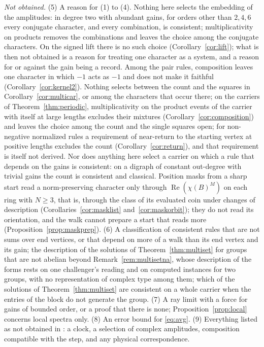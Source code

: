 \emph{Not obtained.} (5) A reason for (1) to (4). Nothing here selects the embedding of the amplitudes: in degree two with abundant gains, for orders other than $2,4,6$ every conjugate character, and every combination, is consistent; multiplicativity on products removes the combinations and leaves the choice among the conjugate characters. On the signed lift there is no such choice (Corollary~\ref{cor:lift}); what is then not obtained is a reason for treating one character as a system, and a reason for or against the gain being a record. Among the pair rules, composition leaves one character in which $-1$ acts as $-1$ and does not make it faithful (Corollary~\ref{cor:kernel2}). Nothing selects between the count and the squares in Corollary~\ref{cor:multicar}, or among the characters that occur there; on the carriers of Theorem~\ref{thm:periodic}, multiplicativity on the product events of the carrier with itself at large lengths excludes their mixtures (Corollary~\ref{cor:composition}) and leaves the choice among the count and the single squares open; for non-negative normalized rules a requirement of near-return to the starting vertex at positive lengths excludes the count (Corollary~\ref{cor:return}), and that requirement is itself not derived. Nor does anything here select a carrier on which a rule that depends on the gains is consistent: on a digraph of constant out-degree with trivial gains the count is consistent and classical. Position masks from a sharp start read a norm-preserving character only through $\operatorname{Re}(\chi(B)^{M})$ on each ring with $N\ge3$, that is, through the class of its evaluated coin under changes of description (Corollaries~\ref{cor:masklist} and~\ref{cor:maskorbit}); they do not read its orientation, and the walk cannot prepare a start that reads more (Proposition~\ref{prop:maskprep}). (6) A classification of consistent rules that are not sums over end vertices, or that depend on more of a walk than its end vertex and its gain; the description of the solutions of Theorem~\ref{thm:multiset} for groups that are not abelian beyond Remark~\ref{rem:multisetna}, whose description of the forms rests on one challenger's reading and on computed instances for two groups, with no representation of complex type among them; which of the solutions of Theorem~\ref{thm:multiset} are consistent on a whole carrier when the entries of the block do not generate the group. (7) A ray limit with a force for gains of bounded order, or a proof that there is none; Proposition~\ref{prop:local} concerns local spectra only. (8) An error bound for \eqref{eq:avg}. (9) Everything listed as not obtained in \cite{g8,g9}: a clock, a selection of complex amplitudes, composition compatible with the step, and any physical correspondence.

